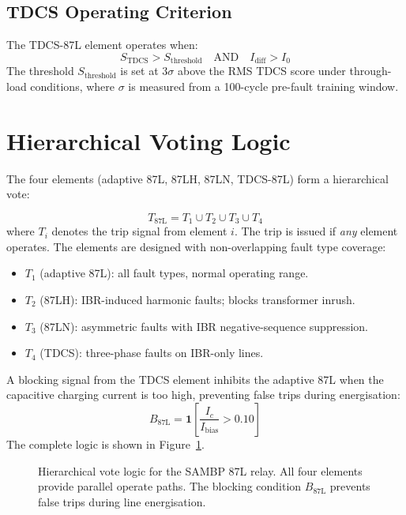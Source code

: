\subsection{TDCS Operating Criterion}

The TDCS-87L element operates when:
\begin{equation}
  S_\mathrm{TDCS} > S_\mathrm{threshold}
  \quad\text{AND}\quad
  I_\mathrm{diff} > I_0
  \label{eq:ch4_tdcs_criterion}
\end{equation}
The threshold $S_\mathrm{threshold}$ is set at 3$\sigma$ above the RMS
TDCS score under through-load conditions, where $\sigma$ is measured from
a 100-cycle pre-fault training window.

\section{Hierarchical Voting Logic}
\label{sec:ch4_coordination}

The four elements (adaptive 87L, 87LH, 87LN, TDCS-87L) form a
hierarchical vote:

\begin{equation}
  T_\mathrm{87L} = T_1 \cup T_2 \cup T_3 \cup T_4
  \label{eq:ch4_vote}
\end{equation}
where $T_i$ denotes the trip signal from element $i$. The trip is issued
if \emph{any} element operates. The elements are designed with non-overlapping
fault type coverage:
\begin{itemize}
\item $T_1$ (adaptive 87L): all fault types, normal operating range.
\item $T_2$ (87LH): IBR-induced harmonic faults; blocks transformer inrush.
\item $T_3$ (87LN): asymmetric faults with IBR negative-sequence suppression.
\item $T_4$ (TDCS): three-phase faults on IBR-only lines.
\end{itemize}

A blocking signal from the TDCS element inhibits the adaptive 87L when
the capacitive charging current is too high, preventing false trips during
energisation:
\begin{equation}
  B_\mathrm{87L} = \mathbf{1}\!\left[\frac{I_c}{I_\mathrm{bias}} > 0.10\right]
  \label{eq:ch4_block}
\end{equation}
The complete logic is shown in Figure~\ref{fig:ch4_logic}.

\begin{figure}[htbp]
  \centering
  
  \caption{Hierarchical vote logic for the SAMBP 87L relay.
           All four elements provide parallel operate paths.
           The blocking condition $B_\mathrm{87L}$ prevents false
           trips during line energisation.}
  \label{fig:ch4_logic}
\end{figure}

